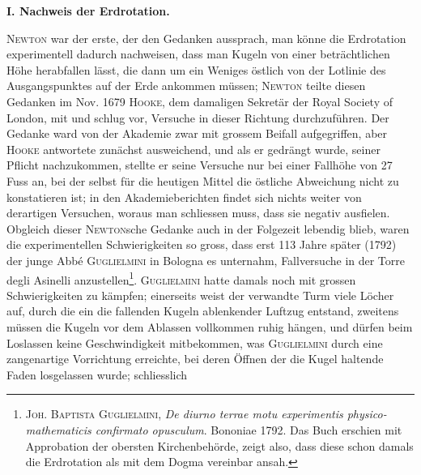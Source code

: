 \clearpage\begingroup\NoSourceHead{}
\HistoricalFoot{}{1\textsuperscript{*}}
\makeatletter\tagsleft@true\makeatother
\renewcommand{\thefootnote}{\arabic{footnote})}\setcounter{footnote}{0}
\begin{center}{\bfseries I. Nachweis der Erdrotation.}\\[5pt]
\end{center}
\noindent\hspace*{\parindent}\textsc{Newton} war der erste, der den Gedanken aussprach, man könne die Erdrotation
experimentell dadurch nachweisen, dass man Kugeln von einer beträchtlichen
Höhe herabfallen lässt, die dann um ein Weniges östlich von
der Lotlinie des Ausgangspunktes auf der Erde ankommen müssen; \textsc{Newton}
teilte diesen Gedanken im Nov. 1679 \textsc{Hooke}, dem damaligen Sekretär der
Royal Society of London, mit und schlug vor, Versuche in dieser Richtung
durchzuführen. Der Gedanke ward von der Akademie zwar mit grossem Beifall
aufgegriffen, aber \textsc{Hooke} antwortete zunächst ausweichend, und als er
gedrängt wurde, seiner Pflicht nachzukommen, stellte er seine Versuche nur
bei einer Fallhöhe von 27 Fuss an, bei der selbst für die heutigen Mittel
die östliche Abweichung nicht zu konstatieren ist; in den Akademieberichten
findet sich nichts weiter von derartigen Versuchen, woraus man schliessen
muss, dass sie negativ ausfielen. Obgleich dieser \textsc{Newton}sche Gedanke auch
in der Folgezeit lebendig blieb, waren die experimentellen Schwierigkeiten
so gross, dass erst 113 Jahre später (1792) der junge Abbé \textsc{Guglielmini} in
Bologna es unternahm, Fallversuche in der Torre degli Asinelli anzustellen\footnote{\textsc{Joh. Baptista Guglielmini}, \textit{De diurno terrae motu experimentis physico-mathematicis confirmato opusculum}. Bononiae 1792. Das Buch erschien mit Approbation der obersten Kirchenbehörde, zeigt also,
dass diese schon damals die Erdrotation als mit dem Dogma vereinbar ansah.}.
\textsc{Guglielmini} hatte damals noch mit grossen Schwierigkeiten zu kämpfen; einerseits
weist der verwandte Turm viele Löcher auf, durch die ein die fallenden Kugeln
ablenkender Luftzug entstand, zweitens müssen die Kugeln vor dem Ablassen
vollkommen ruhig hängen, und dürfen beim Loslassen keine Geschwindigkeit
mitbekommen, was \textsc{Guglielmini} durch eine zangenartige Vorrichtung erreichte,
bei deren Öffnen der die Kugel haltende Faden losgelassen wurde; schliesslich
\clearpage{}
